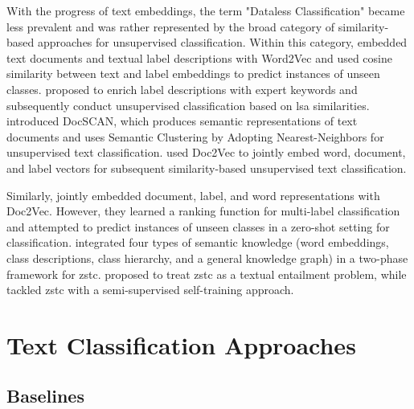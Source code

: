 \documentclass[sigconf]{acmart}
\begin{document}
With the progress of text embeddings, the term "Dataless Classification" became less prevalent and was rather represented by the broad category of similarity-based approaches for unsupervised classification. Within this category, \citet{zero-shot-semsim} embedded text documents and textual label descriptions with Word2Vec and used cosine similarity between text and label embeddings to predict instances of unseen classes. \citet{haj-yahia-etal-2019-towards} proposed to enrich label descriptions with expert keywords and subsequently conduct unsupervised classification based on \ac{lsa} \cite{Deerwester1990IndexingBL} similarities. \citet{Stammbach2021DocSCANUT} introduced DocSCAN, which produces semantic representations of text documents and uses Semantic Clustering by Adopting Nearest-Neighbors for unsupervised text classification. \citet{webist21} used Doc2Vec \cite{pmlr-v32-le14} to jointly embed word, document, and label vectors for subsequent similarity-based unsupervised text classification. 

Similarly, \citet{AAAI1612058} jointly embedded document, label, and word representations with Doc2Vec. However, they learned a ranking function for multi-label classification and attempted to predict instances of unseen classes in a zero-shot setting for classification. \citet{zhang-etal-2019-integrating} integrated four types of semantic knowledge (word embeddings, class descriptions, class hierarchy, and a general knowledge graph) in a two-phase framework for \ac{zstc}. \citet{yin-etal-2019-benchmarking} proposed to treat \ac{zstc} as a textual entailment problem, while \citet{ye-etal-2020-zero} tackled \ac{zstc} with a semi-supervised self-training approach.
 
\section{Text Classification Approaches}

\subsection{Baselines}\label{sec:baselines}
\end{document}

